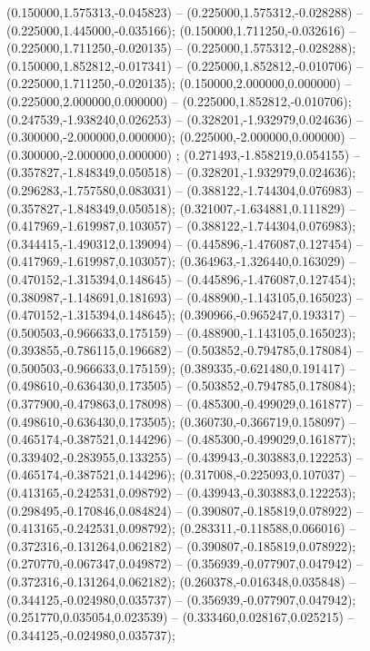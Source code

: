  (0.150000,1.575313,-0.045823) -- (0.225000,1.575312,-0.028288) -- (0.225000,1.445000,-0.035166);
 (0.150000,1.711250,-0.032616) -- (0.225000,1.711250,-0.020135) -- (0.225000,1.575312,-0.028288);
 (0.150000,1.852812,-0.017341) -- (0.225000,1.852812,-0.010706) -- (0.225000,1.711250,-0.020135);
 (0.150000,2.000000,0.000000) -- (0.225000,2.000000,0.000000) -- (0.225000,1.852812,-0.010706);
 (0.247539,-1.938240,0.026253) -- (0.328201,-1.932979,0.024636) -- (0.300000,-2.000000,0.000000);
 (0.225000,-2.000000,0.000000) -- (0.300000,-2.000000,0.000000) ;
 (0.271493,-1.858219,0.054155) -- (0.357827,-1.848349,0.050518) -- (0.328201,-1.932979,0.024636);
 (0.296283,-1.757580,0.083031) -- (0.388122,-1.744304,0.076983) -- (0.357827,-1.848349,0.050518);
 (0.321007,-1.634881,0.111829) -- (0.417969,-1.619987,0.103057) -- (0.388122,-1.744304,0.076983);
 (0.344415,-1.490312,0.139094) -- (0.445896,-1.476087,0.127454) -- (0.417969,-1.619987,0.103057);
 (0.364963,-1.326440,0.163029) -- (0.470152,-1.315394,0.148645) -- (0.445896,-1.476087,0.127454);
 (0.380987,-1.148691,0.181693) -- (0.488900,-1.143105,0.165023) -- (0.470152,-1.315394,0.148645);
 (0.390966,-0.965247,0.193317) -- (0.500503,-0.966633,0.175159) -- (0.488900,-1.143105,0.165023);
 (0.393855,-0.786115,0.196682) -- (0.503852,-0.794785,0.178084) -- (0.500503,-0.966633,0.175159);
 (0.389335,-0.621480,0.191417) -- (0.498610,-0.636430,0.173505) -- (0.503852,-0.794785,0.178084);
 (0.377900,-0.479863,0.178098) -- (0.485300,-0.499029,0.161877) -- (0.498610,-0.636430,0.173505);
 (0.360730,-0.366719,0.158097) -- (0.465174,-0.387521,0.144296) -- (0.485300,-0.499029,0.161877);
 (0.339402,-0.283955,0.133255) -- (0.439943,-0.303883,0.122253) -- (0.465174,-0.387521,0.144296);
 (0.317008,-0.225093,0.107037) -- (0.413165,-0.242531,0.098792) -- (0.439943,-0.303883,0.122253);
 (0.298495,-0.170846,0.084824) -- (0.390807,-0.185819,0.078922) -- (0.413165,-0.242531,0.098792);
 (0.283311,-0.118588,0.066016) -- (0.372316,-0.131264,0.062182) -- (0.390807,-0.185819,0.078922);
 (0.270770,-0.067347,0.049872) -- (0.356939,-0.077907,0.047942) -- (0.372316,-0.131264,0.062182);
 (0.260378,-0.016348,0.035848) -- (0.344125,-0.024980,0.035737) -- (0.356939,-0.077907,0.047942);
 (0.251770,0.035054,0.023539) -- (0.333460,0.028167,0.025215) -- (0.344125,-0.024980,0.035737);
